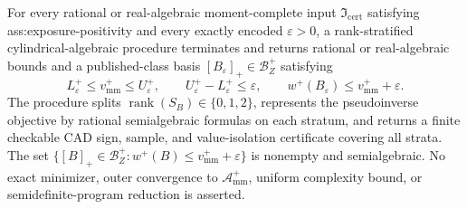 For every rational or real-algebraic moment-complete input \(\mathfrak I_{\mathrm{cert}}\) satisfying ass:exposure-positivity and every exactly encoded \(\varepsilon>0\), a rank-stratified cylindrical-algebraic procedure terminates and returns rational or real-algebraic bounds and a published-class basis \([B_\varepsilon]_+\in\mathcal B_Z^+\) satisfying
\[
L_\varepsilon^+\le v_{\mathrm{mm}}^+\le U_\varepsilon^+,
\qquad U_\varepsilon^+-L_\varepsilon^+\le\varepsilon,
\qquad w^+(B_\varepsilon)\le v_{\mathrm{mm}}^++\varepsilon.
\]
The procedure splits \(\operatorname{rank}(S_B)\in\{0,1,2\}\), represents the pseudoinverse objective by rational semialgebraic formulas on each stratum, and returns a finite checkable CAD sign, sample, and value-isolation certificate covering all strata.  The set \(\{[B]_+\in\mathcal B_Z^+:w^+(B)\le v_{\mathrm{mm}}^++\varepsilon\}\) is nonempty and semialgebraic.  No exact minimizer, outer convergence to \(\mathcal A_{\mathrm{mm}}^+\), uniform complexity bound, or semidefinite-program reduction is asserted.